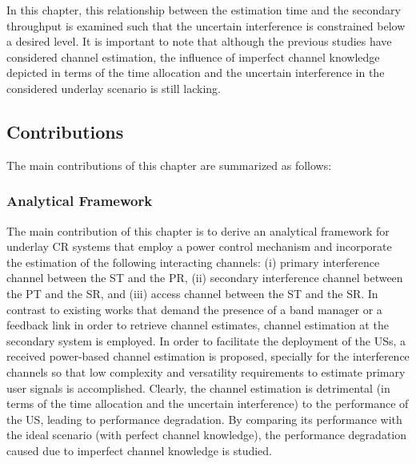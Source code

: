  In this chapter, this relationship between the estimation time and the secondary throughput is examined such that the uncertain interference is constrained below a desired level. It is important to note that although the previous studies have considered channel estimation, the influence of imperfect channel knowledge depicted in terms of the time allocation and the uncertain interference in the considered underlay scenario is still lacking.
 


\subsection{Contributions}
The main contributions of this chapter are summarized as follows: 
\subsubsection{Analytical Framework}
The main contribution of this chapter is to derive an analytical framework for underlay CR systems that employ a power control mechanism and incorporate the estimation of the following interacting channels: (i) primary interference channel between the ST and the PR, (ii) secondary interference channel between the PT and the SR, and (iii) access channel between the ST and the SR. In contrast to existing works that demand the presence of a band manager or a feedback link in order to retrieve channel estimates, channel estimation at the secondary system is employed. In order to facilitate the deployment of the USs, a received power-based channel estimation is proposed, specially for the interference channels so that low complexity and versatility requirements to estimate primary user signals is accomplished. Clearly, the channel estimation is detrimental (in terms of the time allocation and the uncertain interference) to the performance of the US, leading to performance degradation. By comparing its performance with the ideal scenario (with perfect channel knowledge), the performance degradation caused due to imperfect channel knowledge is studied. 

